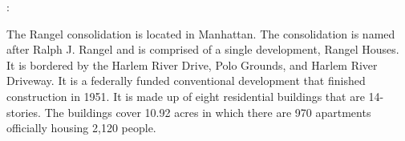 : 

The Rangel consolidation is located in Manhattan. The consolidation is named after Ralph J. Rangel and is comprised of a single development, Rangel Houses. It is bordered by the Harlem River Drive, Polo Grounds, and Harlem River Driveway. It is a federally funded conventional development that finished construction in 1951. It is made up of eight residential buildings that are 14-stories. The buildings cover 10.92 acres in which there are 970 apartments officially housing 2,120 people. 